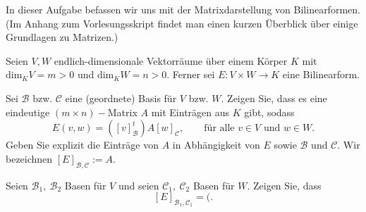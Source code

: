 \begin{Problem}
In dieser Aufgabe befassen wir uns mit der Matrixdarstellung von Bilinearformen. (Im Anhang zum Vorlesungsskript findet man einen kurzen Überblick über einige Grundlagen zu Matrizen.)	

Seien $V,W$ endlich-dimensionale Vektorr\"{a}ume \"{u}ber einem K\"{o}rper $K$ mit $\text{dim}_K V=m>0$ und $\text{dim}_K W=n>0$. Ferner sei $E:V\times W\to K$ eine Bilinearform.
\begin{parts}
\item Sei $\mathcal{B}$ bzw. $\mathcal{C}$ eine (geordnete) Basis f\"{u}r $V$ bzw. $W$. Zeigen Sie, dass es eine eindeutige $(m\times n)-$Matrix $A$ mit Eintr\"{a}gen aus $K$ gibt, sodass
	\[
	E(v,w)=([v]_\mathcal{B}^t)A[w]_{\mathcal{C}}
	,\qquad\text{f\"{u}r alle }v\in V\text{ und }w\in W.\] 
	Geben Sie explizit die Eintr\"{a}ge von $A$ in Abh\"{a}ngigkeit von $E$ sowie $\mathcal{B}$ und $\mathcal{C}$. Wir bezeichnen $[E]_{\mathcal{B},\mathcal{C}}:=A$.
\item Seien $\mathcal{B}_1,~\mathcal{B}_2$ Basen f\"{u}r $V$ und seien $\mathcal{C}_1,~\mathcal{C}_2$ Basen f\"{u}r $W$. Zeigen Sie, dass
	\[
	[E]_{\mathcal{B}_1,\mathcal{C}_1}=(
	.\] 
\end{parts}
\end{Problem}
